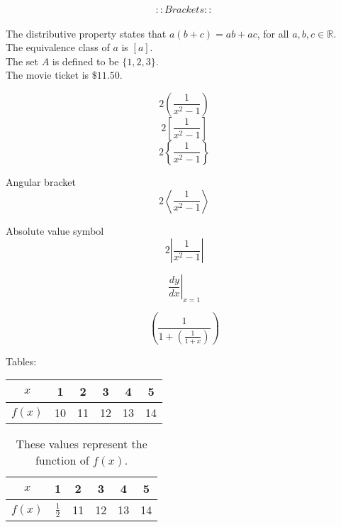 \documentclass[11pt]{article}
\begin{document}
$$::Brackets::$$\\[20pt]
The distributive property states that $a(b+c)=ab+ac$, for all $a, b, c \in \mathbb{R}$.\\[6pt]
The equivalence class of $a$ is $[a]$.\\[6pt]
The set $A$ is defined to be $\{1,2,3\}$.\\[6pt]
The movie ticket is $\$11.50$.

$$2\left(\frac{1}{x^2-1}\right)$$
$$2\left[\frac{1}{x^2-1}\right]$$
$$2\left\{\frac{1}{x^2-1}\right\}$$

Angular bracket
$$2\left \langle \frac{1}{x^2-1}\right \rangle $$

Absolute value symbol
$$2\left | \frac{1}{x^2-1}\right | $$

$$\left.\frac{dy}{dx}\right|_{x=1}$$

$$\left(\frac{1}{1+\left(\frac{1}{1+x}\right)}\right)$$




Tables:\\

\begin{tabular}{|c||c|c|c|c|c|}

\hline
$x$ & 1 & 2 & 3 & 4 & 5 \\ \hline
$f(x)$ & 10 & 11 & 12 & 13 & 14 \\ \hline
\end{tabular}


\vspace{1cm}


\begin{table}[H]
\centering
\def \arraystretch{1.5}
\begin{tabular}{|c||c|c|c|c|c|}
\hline
$x$ & 1 & 2 & 3 & 4 & 5 \\ \hline
$f(x)$ & $\frac{1}{2}$ & 11 & 12 & 13 & 14 \\ \hline
\end{tabular}
\caption{These values represent the function of $f(x)$.}
\end{table}
\end{document}
